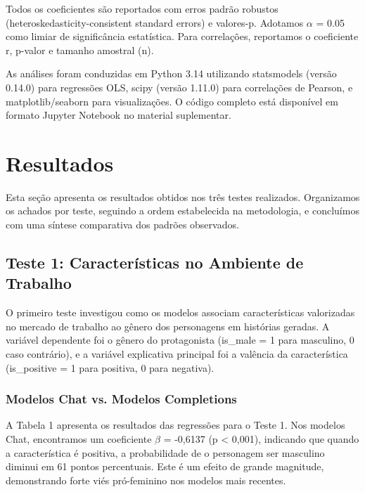 \documentclass[12pt,a4paper]{article}
\begin{document}
Todos os coeficientes são reportados com erros padrão robustos
(heteroskedasticity-consistent standard errors) e valores-p. Adotamos $\alpha$
= 0.05 como limiar de significância estatística. Para correlações,
reportamos o coeficiente r, p-valor e tamanho amostral (n).

As análises foram conduzidas em Python 3.14 utilizando statsmodels
(versão 0.14.0) para regressões OLS, scipy (versão 1.11.0) para
correlações de Pearson, e matplotlib/seaborn para visualizações. O
código completo está disponível em formato Jupyter Notebook no material
suplementar.




\section{Resultados}




Esta seção apresenta os resultados obtidos nos três testes realizados.
Organizamos os achados por teste, seguindo a ordem estabelecida na
metodologia, e concluímos com uma síntese comparativa dos padrões
observados.


\subsection{Teste 1: Características no Ambiente de Trabalho}


O primeiro teste investigou como os modelos associam características
valorizadas no mercado de trabalho ao gênero dos personagens em
histórias geradas. A variável dependente foi o gênero do protagonista
(is\_male = 1 para masculino, 0 caso contrário), e a variável explicativa
principal foi a valência da característica (is\_positive = 1 para
positiva, 0 para negativa).


\subsubsection{Modelos Chat vs. Modelos Completions}


A Tabela 1 apresenta os resultados das regressões para o Teste 1. Nos
modelos Chat, encontramos um coeficiente $\beta$ = -0,6137 (p < 0,001),
indicando que quando a característica é positiva, a probabilidade de o
personagem ser masculino diminui em 61 pontos percentuais. Este é um
efeito de grande magnitude, demonstrando forte viés pró-feminino nos
modelos mais recentes.
\end{document}
